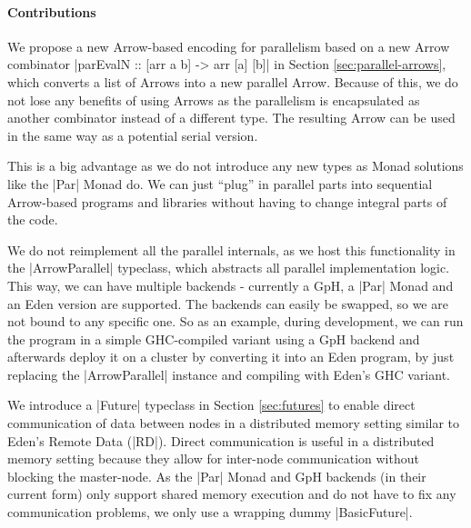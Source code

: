 \paragraph{Contributions}
%
%
We propose a new Arrow-based encoding for parallelism based on a new Arrow combinator |parEvalN :: [arr a b] -> arr [a] [b]| in Section \ref{sec:parallel-arrows}, which converts a list of Arrows into a new parallel Arrow. Because of this, we do not lose any benefits of using Arrows as the parallelism is encapsulated as another combinator instead of a different type. The resulting Arrow can be used in the same way as a potential serial version.

This is a big advantage as we do not introduce any new types as Monad solutions like the |Par| Monad do. We can just \enquote{plug} in parallel parts into sequential Arrow-based programs and libraries without having to change integral parts of the code. 


We do not reimplement all the parallel internals, as we host this functionality in the |ArrowParallel| typeclass, which abstracts all parallel implementation logic. This way, we can have multiple backends - currently a GpH, a |Par| Monad and an Eden version are supported. The backends can easily be swapped, so we are not bound to any specific one. So as an example, during development, we can run the program in a simple GHC-compiled variant using a GpH backend and afterwards deploy it on a cluster by converting it into an Eden program, by just replacing the |ArrowParallel| instance and compiling with Eden's GHC variant.

We introduce a |Future| typeclass in Section \ref{sec:futures} to enable direct communication of data between nodes in a distributed memory setting similar to Eden's Remote Data (|RD|). Direct communication is useful in a distributed memory setting because they allow for inter-node communication without blocking the master-node. As the |Par| Monad and GpH backends (in their current form) only support shared memory execution and do not have to fix any communication problems, we only use a wrapping dummy |BasicFuture|.

